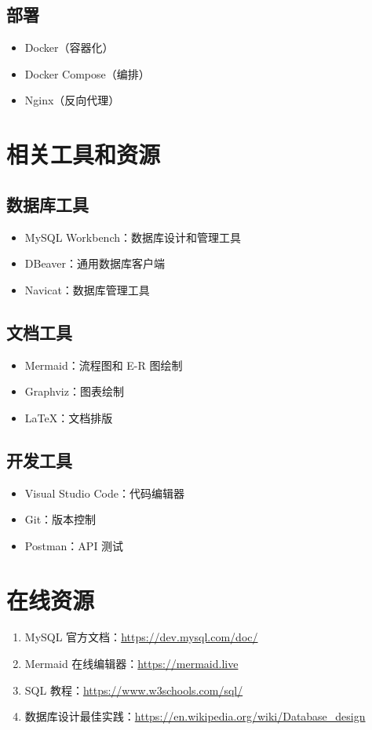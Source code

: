 \subsection{部署}

\begin{itemize}
  \item Docker（容器化）
  \item Docker Compose（编排）
  \item Nginx（反向代理）
\end{itemize}

\section{相关工具和资源}

\subsection{数据库工具}

\begin{itemize}
  \item MySQL Workbench：数据库设计和管理工具
  \item DBeaver：通用数据库客户端
  \item Navicat：数据库管理工具
\end{itemize}

\subsection{文档工具}

\begin{itemize}
  \item Mermaid：流程图和 E-R 图绘制
  \item Graphviz：图表绘制
  \item LaTeX：文档排版
\end{itemize}

\subsection{开发工具}

\begin{itemize}
  \item Visual Studio Code：代码编辑器
  \item Git：版本控制
  \item Postman：API 测试
\end{itemize}

\section{在线资源}

\begin{enumerate}
  \item MySQL 官方文档：\url{https://dev.mysql.com/doc/}
  \item Mermaid 在线编辑器：\url{https://mermaid.live}
  \item SQL 教程：\url{https://www.w3schools.com/sql/}
  \item 数据库设计最佳实践：\url{https://en.wikipedia.org/wiki/Database\_design}
\end{enumerate}
